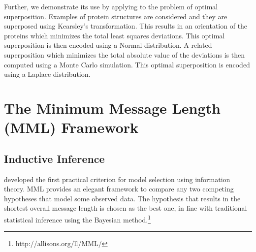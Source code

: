 \documentclass[wcp]{jmlr}
\begin{document}
Further, we demonstrate its use by applying to the problem of optimal superposition.
Examples of protein structures are considered
and they are superposed using Kearsley's transformation. This results in an
orientation of the proteins which minimizes the total least squares deviations. 
This optimal superposition is then encoded using a Normal distribution.
A related superposition which minimizes the total absolute 
value of the deviations is then computed using a Monte Carlo 
simulation. This optimal superposition is encoded using a Laplace distribution.

\section{The Minimum Message Length (MML) Framework}
\subsection{Inductive Inference}
\citet{wallace68} developed the first practical criterion for model selection using 
information theory. MML provides an elegant framework to compare any two competing 
hypotheses that model some observed data. The hypothesis that results in the shortest 
overall message length is chosen as the best one, in line with traditional statistical 
inference using the Bayesian method.\footnote{http://allisons.org/ll/MML/} \\
\end{document}
